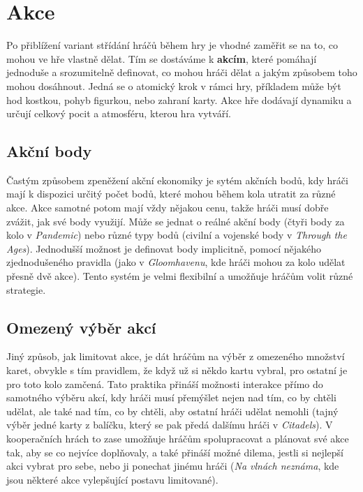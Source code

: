 
\section{Akce}
\label{sec:actions}

Po přiblížení variant střídání hráčů během hry je vhodné zaměřit se na to, co mohou ve hře vlastně dělat. Tím se dostáváme k \textbf{akcím}, které pomáhají jednoduše a srozumitelně definovat, co mohou hráči dělat a jakým způsobem toho mohou dosáhnout. Jedná se o atomický krok v rámci hry, příkladem může být hod kostkou, pohyb figurkou, nebo zahraní karty. Akce hře dodávají dynamiku a určují celkový pocit a atmosféru, kterou hra vytváří.

\subsection{Akční body}
\label{subsec:action_points}

Častým způsobem zpeněžení akční ekonomiky je sytém akčních bodů, kdy hráči mají k dispozici určitý počet bodů, které mohou během kola utratit za různé akce. Akce samotné potom mají vždy nějakou cenu, takže hráči musí dobře zvážit, jak své body využijí. Může se jednat o reálné akční body (čtyři body za kolo v \textit{Pandemic}) nebo různé typy bodů (civilní a vojenské body v \textit{Through the Ages}). Jednodušší možnost je definovat body implicitně, pomocí nějakého zjednodušeného pravidla (jako v \textit{Gloomhavenu}, kde hráči mohou za kolo udělat přesně dvě akce). Tento systém je velmi flexibilní a umožňuje hráčům volit různé strategie.

\subsection{Omezený výběr akcí}
\label{subsec:limited_actions}

Jiný způsob, jak limitovat akce, je dát hráčům na výběr z omezeného množství karet, obvykle s tím pravidlem, že když už si někdo kartu vybral, pro ostatní je pro toto kolo zamčená. Tato praktika přináší možnosti interakce přímo do samotného výběru akcí, kdy hráči musí přemýšlet nejen nad tím, co by chtěli udělat, ale také nad tím, co by chtěli, aby ostatní hráči udělat nemohli (tajný výběr jedné karty z balíčku, který se pak předá dalšímu hráči v \textit{Citadels}). V kooperačních hrách to zase umožňuje hráčům spolupracovat a plánovat své akce tak, aby se co nejvíce doplňovaly, a také přináší možné dilema, jestli si nejlepší akci vybrat pro sebe, nebo ji ponechat jinému hráči (\textit{Na vlnách neznáma}, kde jsou některé akce vylepšující postavu limitované).

